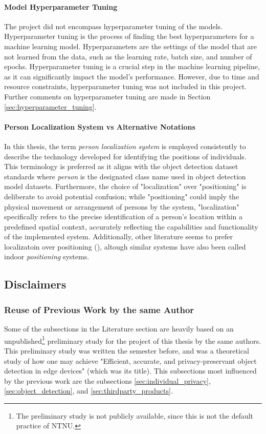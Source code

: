 \paragraph{Model Hyperparameter Tuning}
\label{sec:scope_hyperparameter_tuning}
The project did not encompass hyperparameter tuning of the models. Hyperparameter tuning is the process of finding the best hyperparameters for a machine learning model. Hyperparameters are the settings of the model that are not learned from the data, such as the learning rate, batch size, and number of epochs. Hyperparameter tuning is a crucial step in the machine learning pipeline, as it can significantly impact the model's performance. However, due to time and resource constraints, hyperparameter tuning was not included in this project. Further comments on hyperparameter tuning are made in Section \ref{sec:hyperparameter_tuning}.

\paragraph{Person Localization System vs Alternative Notations}
In this thesis, the term \textit{person localization system} is employed consistently to describe the technology developed for identifying the positions of individuals. This terminology is preferred as it aligns with the object detection dataset standards where \textit{person} is the designated class name used in object detection model datasets. Furthermore, the choice of "localization" over "positioning" is deliberate to avoid potential confusion; while "positioning" could imply the physical movement or arrangement of persons by the system, "localization" specifically refers to the precise identification of a person's location within a predefined spatial context, accurately reflecting the capabilities and functionality of the implemented system. Additionally, other literature seems to prefer localizatoin over positioning (\cite{gao2016development}), altough similar systems have also been called indoor \textit{positioning} systems.

\subsection{Disclaimers}
\label{sec:disclaimers}
\subsubsection{Reuse of Previous Work by the same Author}
\label{sec:disclaimer_reuse}
Some of the subsections in the Literature section are heavily based on an unpublished\footnote{The preliminary study is not publicly available, since this is not the default practice of NTNU.} preliminary study for the project of this thesis by the same authors. This preliminary study was written the semester before, and was a theoretical study of how one may achieve "Efficient, accurate, and privacy-preservant object detection in edge devices" (which was its title). This subsections most influenced by the previous work are the subsections \ref{sec:individual_privacy}, \ref{sec:object_detection}, and \ref{sec:thirdparty_products}.

